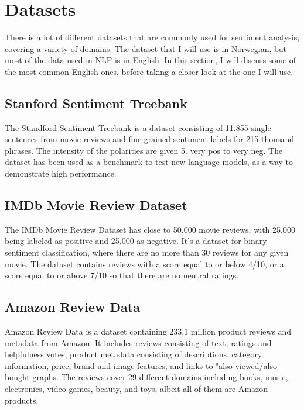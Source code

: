 \documentclass{report}
\begin{document}

\section{Datasets}
There is a lot of different datasets that are commonly used for sentiment analysis, covering a variety of domains. The dataset that I will use is in Norwegian, but most of the data used in NLP is in English. In this section, I will discuss some of the most common English ones, before taking a closer look at the one I will use.
\subsection{Stanford Sentiment Treebank}
The Standford Sentiment Treebank \cite{socher2013recursive} is a dataset consisting of 11.855 single sentences from movie reviews and fine-grained sentiment labels for 215 thousand phrases. The intensity of the polarities are given 5. very pos to very neg. The dataset has been used as a benchmark to test new language models, as a way to demonstrate high performance.
\subsection{IMDb Movie Review Dataset}
The IMDb Movie Review Dataset \cite{maas-EtAl:2011:ACL-HLT2011} has close to 50.000 movie reviews, with 25.000 being labeled as positive and 25.000 as negative. It's a dataset for binary sentiment classification, where there are no more than 30 reviews for any given movie. The dataset contains reviews with a score equal to or below 4/10, or a score equal to or above 7/10 so that there are no neutral ratings.
\subsection{Amazon Review Data}
Amazon Review Data \cite{ni2019justifying} is a dataset containing 233.1 million product reviews and metadata from Amazon. It includes reviews consisting of text, ratings and helpfulness votes, product metadata consisting of descriptions, category information, price, brand and image features, and links to "also viewed/also bought graphs. The reviews cover 29 different domains including books, music, electronics, video games, beauty, and toys, albeit all of them are Amazon-products.
\end{document}
